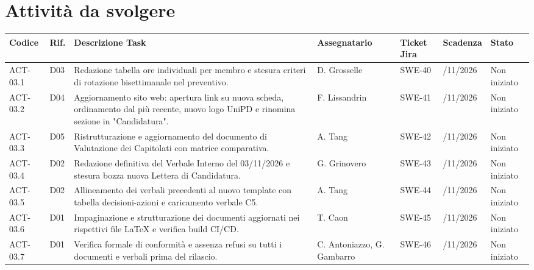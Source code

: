 \newpage

\section{Attività da svolgere}

\renewcommand{\arraystretch}{1.3}
\noindent
{\small\setlength{\tabcolsep}{3pt}%
\begin{tabularx}{\textwidth}{|>{\raggedright\arraybackslash}p{1.75cm}|>{\raggedright\arraybackslash}p{0.75cm}|>{\raggedright\arraybackslash}X|>{\raggedright\arraybackslash}p{2.3cm}|>{\raggedright\arraybackslash}p{1.35cm}|>{\raggedright\arraybackslash}p{1.8cm}|>{\raggedright\arraybackslash}p{1.85cm}|}
    \hline
    \textbf{Codice} & \textbf{Rif.} & \textbf{Descrizione Task} & \textbf{Assegnatario} & \textbf{Ticket Jira} & \textbf{Scadenza} & \textbf{Stato} \\
    \hline
    ACT-03.1 & D03 & Redazione tabella ore individuali per membro e stesura criteri di rotazione bisettimanale nel preventivo. & D. Grosselle & SWE-40 & 04/11/2026 & Non iniziato \\
    \hline
    ACT-03.2 & D04 & Aggiornamento sito web: apertura link su nuova scheda, ordinamento dal più recente, nuovo logo UniPD e rinomina sezione in "Candidatura". & F. Lissandrin & SWE-41 & 04/11/2026 & Non iniziato \\
    \hline
    ACT-03.3 & D05 & Ristrutturazione e aggiornamento del documento di Valutazione dei Capitolati con matrice comparativa. & A. Tang & SWE-42 & 04/11/2026 & Non iniziato \\
    \hline
    ACT-03.4 & D02 & Redazione definitiva del Verbale Interno del 03/11/2026 e stesura bozza nuova Lettera di Candidatura. & G. Grinovero & SWE-43 & 04/11/2026 & Non iniziato \\
    \hline
    ACT-03.5 & D02 & Allineamento dei verbali precedenti al nuovo template con tabella decisioni-azioni e caricamento verbale C5. & A. Tang & SWE-44 & 05/11/2026 & Non iniziato \\
    \hline
    ACT-03.6 & D01 & Impaginazione e strutturazione dei documenti aggiornati nei rispettivi file LaTeX e verifica build CI/CD. & T. Caon & SWE-45 & 05/11/2026 & Non iniziato \\
    \hline
    ACT-03.7 & D01 & Verifica formale di conformità e assenza refusi su tutti i documenti e verbali prima del rilascio. & C. Antoniazzo, G. Gambarro & SWE-46 & 05/11/2026 & Non iniziato \\
    \hline
\end{tabularx}}
